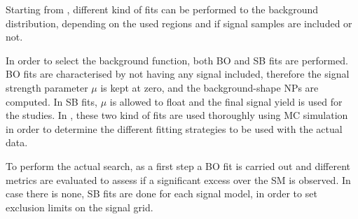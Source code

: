 Starting from \Eqn{\ref{eq:strategy:stat_treatment:stat_model:likelihood}}, different kind of fits can be performed to the background distribution, depending on the used regions and if signal samples are included or not.

In order to select the background function, both \ac{BO} and \ac{SB} fits are performed. \ac{BO} fits are characterised by not having any signal included, therefore the signal strength parameter \(\mu\) is kept at zero, and the background-shape \acp{NP} are computed. In \ac{SB} fits, \(\mu\) is allowed to float and the final signal yield is used for the studies. In \Sect{\ref{sec:bkg:modeling}}, these two kind of fits are used thoroughly using \ac{MC} simulation in order to determine the different fitting strategies to be used with the actual data.


To perform the actual search, as a first step a \ac{BO} fit is carried out and different metrics are evaluated to assess if a significant excess over the \ac{SM} is observed. In case there is none, \ac{SB} fits are done for each signal model, in order to set exclusion limits on the signal grid.